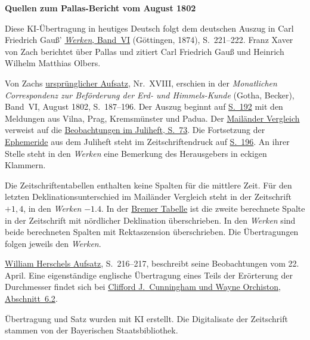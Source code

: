 \clearpage\thispagestyle{empty}
\begin{center}\textbf{Quellen zum Pallas-Bericht vom August 1802}\end{center}
\noindent Diese KI-Übertragung in heutiges Deutsch folgt dem deutschen Auszug in Carl Friedrich Gauß’ \href{https://gdz.sub.uni-goettingen.de/id/PPN236007467}{\textit{Werken}, Band~VI} (Göttingen, 1874), S.~221--222. Franz Xaver von Zach berichtet über Pallas und zitiert Carl Friedrich Gauß und Heinrich Wilhelm Matthias Olbers.
\par\smallskip\noindent Von Zachs \href{https://api.digitale-sammlungen.de/iiif/image/v2/bsb10538598_00195/full/1450,/0/default.jpg}{ursprünglicher Aufsatz}, Nr.~XVIII, erschien in der \textit{Monatlichen Correspondenz zur Beförderung der Erd- und Himmels-Kunde} (Gotha, Becker), Band~VI, August 1802, S.~187--196. Der Auszug beginnt auf \href{https://api.digitale-sammlungen.de/iiif/image/v2/bsb10538598_00200/full/1450,/0/default.jpg}{S.~192} mit den Meldungen aus Vilna, Prag, Kremsmünster und Padua. Der \href{https://api.digitale-sammlungen.de/iiif/image/v2/bsb10538598_00201/full/1450,/0/default.jpg}{Mailänder Vergleich} verweist auf die \href{https://api.digitale-sammlungen.de/iiif/image/v2/bsb10538598_00079/full/1450,/0/default.jpg}{Beobachtungen im Juliheft, S.~73}. Die Fortsetzung der \href{https://api.digitale-sammlungen.de/iiif/image/v2/bsb10538598_00091/full/1450,/0/default.jpg}{Ephemeride} aus dem Juliheft steht im Zeitschriftendruck auf \href{https://api.digitale-sammlungen.de/iiif/image/v2/bsb10538598_00204/full/1450,/0/default.jpg}{S.~196}. An ihrer Stelle steht in den \textit{Werken} eine Bemerkung des Herausgebers in eckigen Klammern.
\par\smallskip\noindent Die Zeitschriftentabellen enthalten keine Spalten für die mittlere Zeit. Für den letzten Deklinationsunterschied im Mailänder Vergleich steht in der Zeitschrift \(+1{,}4\), in den \textit{Werken} \(-1.4\). In der \href{https://api.digitale-sammlungen.de/iiif/image/v2/bsb10538598_00202/full/1450,/0/default.jpg}{Bremer Tabelle} ist die zweite berechnete Spalte in der Zeitschrift mit nördlicher Deklination überschrieben. In den \textit{Werken} sind beide berechneten Spalten mit Rektaszension überschrieben. Die Übertragungen folgen jeweils den \textit{Werken}.
\par\smallskip\noindent \href{https://doi.org/10.1098/rstl.1802.0010}{William Herschels Aufsatz}, S.~216--217, beschreibt seine Beobachtungen vom 22. April. Eine eigenständige englische Übertragung eines Teils der Erörterung der Durchmesser findet sich bei \href{https://doi.org/10.1007/978-3-319-07614-0_14}{Clifford J.\ Cunningham und Wayne Orchiston, Abschnitt~6.2}.
\par\smallskip\noindent Übertragung und Satz wurden mit KI erstellt. Die Digitalisate der Zeitschrift stammen von der Bayerischen Staatsbibliothek.
\clearpage
